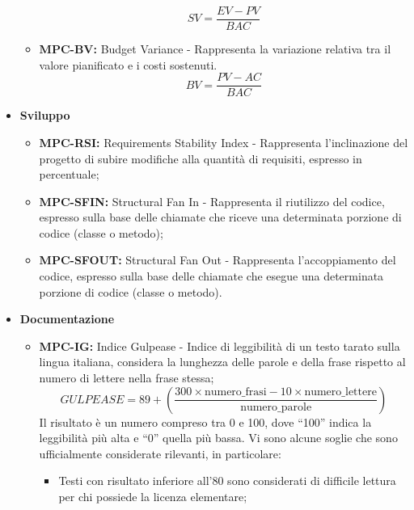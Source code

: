 \documentclass[8pt]{article}
\begin{document}
\begin{itemize}
\begin{itemize}
                \begin{equation}
                SV = \frac{EV - PV}{BAC}
                \end{equation}
            \item \textbf{MPC-BV:} Budget Variance - Rappresenta la variazione relativa tra il valore pianificato e i costi sostenuti.
                \begin{equation}
                BV = \frac{PV - AC}{BAC}
                \end{equation}
        \end{itemize}        
       \clearpage
    \item \textbf{Sviluppo}
        \begin{itemize}
            \item \textbf{MPC-RSI:} Requirements Stability Index - Rappresenta l'inclinazione del progetto di subire modifiche alla quantità di requisiti, espresso in percentuale;
            \item \textbf{MPC-SFIN:} Structural Fan In - Rappresenta il riutilizzo del codice, espresso sulla base delle chiamate che riceve una determinata porzione di codice (classe o metodo);
            \item \textbf{MPC-SFOUT:} Structural Fan Out - Rappresenta l'accoppiamento del codice, espresso sulla base delle chiamate che esegue una determinata porzione di codice (classe o metodo).
        \end{itemize}
   \item \textbf{Documentazione}
        \begin{itemize}
            \item \textbf{MPC-IG:} Indice Gulpease - Indice di leggibilità di un testo tarato sulla
                lingua italiana, considera la lunghezza delle parole e della frase rispetto al
                numero di lettere nella frase stessa;
                \begin{equation}
                GULPEASE = 89 + \left(\frac{{300 \times \text{numero\_frasi} - 10 \times \text{numero\_lettere}}}{{\text{numero\_parole}}}\right)
                \end{equation}
                Il risultato è un numero compreso tra 0 e 100, dove ``100'' indica la leggibilità più alta e ``0'' quella più bassa. Vi sono alcune soglie che sono ufficialmente considerate rilevanti, in particolare:
                \begin{itemize}
                    \item Testi con risultato inferiore all'80 sono considerati di difficile lettura per chi possiede la licenza elementare;

\end{itemize}
\end{itemize}
\end{itemize}
\end{document}
